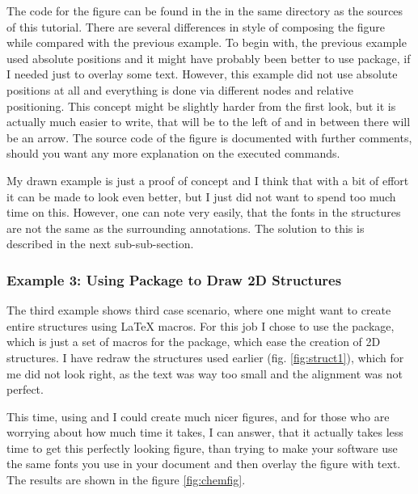 \documentclass[
]{scrartcl}
\begin{document}
%
The code for the figure can be found in the  in the same
    directory as the sources of this tutorial.
%
There are several differences in style of composing the figure while compared
    with the previous  example.
%
To begin with, the previous example used absolute positions and it might have
    probably been better to use  package, if I needed just to
    overlay some text.
%
However, this example did not use absolute positions at all and everything is
    done via different nodes and relative positioning.
%
This concept might be slightly harder from the first look, but it is actually
    much easier to write, that  will be to the left of  and
    in between there will be an arrow.
%
The source code of the figure is documented with further comments, should you
    want any more explanation on the executed commands.

My drawn example is just a proof of concept and I think that with a bit of
    effort it can be made to look even better, but I just did not want to spend
    too much time on this.
%
However, one can note very easily, that the fonts in the structures are not the
    same as the surrounding annotations.
%
The solution to this is described in the next sub-sub-section.

%
\clearpage
\subsubsection{Example 3: Using  Package to Draw 2D Structures}

%
The third example shows third case scenario, where one might want to create
    entire structures using \LaTeX{} macros.
%
For this job I chose to use the  package, which is just a set of
    macros for the  package, which ease the creation of 2D structures.
%
I have redraw the structures used earlier (fig. \ref{fig:struct1}), which for
    me did not look right, as the text was way too small and the alignment was
    not perfect.

%
This time, using  and  I could create much nicer figures,
    and for those who are worrying about how much time it takes, I can answer,
    that it actually takes less time to get this perfectly looking figure, than
    trying to make your software use the same fonts you use in your document and
    then overlay the figure with text.
%
The results are shown in the figure \ref{fig:chemfig}.
\end{document}

